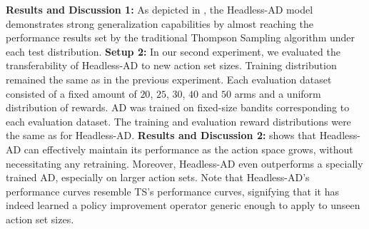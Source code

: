 \documentclass{article}
\theoremstyle{plain}
\theoremstyle{definition}
\theoremstyle{remark}
\begin{document}
\textbf{Results and Discussion 1:} As depicted in , the Headless-AD model demonstrates strong generalization capabilities by almost reaching the performance results set by the traditional Thompson Sampling algorithm under each test distribution.
\textbf{Setup 2:} In our second experiment, we evaluated the transferability of Headless-AD to new action set sizes. Training distribution remained the same as in the previous experiment. Each evaluation dataset consisted of a fixed amount of $20$, $25$, $30$, $40$ and $50$ arms and a uniform distribution of rewards. AD was trained on fixed-size bandits corresponding to each evaluation dataset. The training and evaluation reward distributions were the same as for Headless-AD.
\textbf{Results and Discussion 2:}  shows that Headless-AD can effectively maintain its performance as the action space grows, without necessitating any retraining. Moreover, Headless-AD even outperforms a specially trained AD, especially on larger action sets. Note that Headless-AD's performance curves resemble TS's performance curves, signifying that it has indeed learned a policy improvement operator generic enough to apply to unseen action set sizes.
\end{document}
